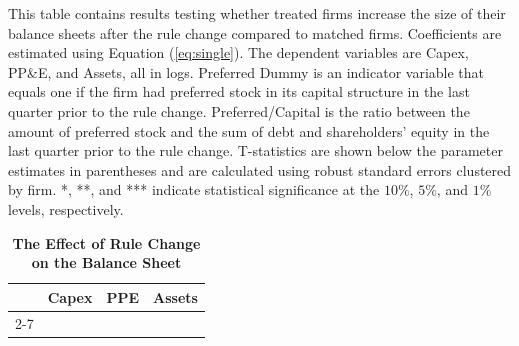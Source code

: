 \documentclass[a4paper, 12pt]{article}
\begin{document}
\begin{table}[htbp]
\caption{\textbf{The Effect of Rule Change on the Balance Sheet}} \label{table_bs}
\begin{singlespace}
\begin{small}

\noindent This table contains results testing whether treated firms increase the size of their balance sheets after the rule change compared to matched firms. Coefficients are estimated using Equation (\ref{eq:single}). The dependent variables are Capex, PP\&E, and Assets, all in logs. Preferred Dummy is an indicator variable that equals one if the firm had preferred stock in its capital structure in the last quarter prior to the rule change. Preferred/Capital is the ratio between the amount of preferred stock and the sum of debt and shareholders' equity in the last quarter prior to the rule change. T-statistics are shown below the parameter estimates in parentheses and are calculated using robust standard errors clustered by firm. *, **, and *** indicate statistical significance at the $10\%$, $5\%$, and $1\%$ levels, respectively.

\end{small}
\end{singlespace}
\vspace{3mm}
\small
  \centering
    \begin{tabular}{lcccccc}
    \toprule
    \textbf{ } &
      \multicolumn{2}{c}{\textbf{Capex}} &  \multicolumn{2}{c}{\textbf{PPE}} &
      \multicolumn{2}{c}{\textbf{Assets}}
      \\
      \cline{2-7}
  


    \bottomrule
    \end{tabular}
\end{table}
\clearpage

\newpage
\end{document}
